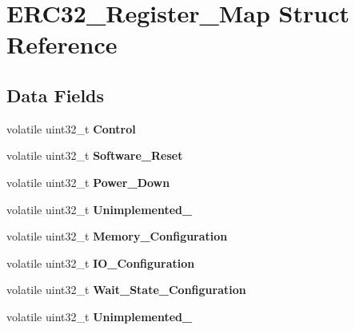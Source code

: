 \hypertarget{structERC32__Register__Map}{}\section{E\+R\+C32\+\_\+\+Register\+\_\+\+Map Struct Reference}
\label{structERC32__Register__Map}
\subsection*{Data Fields}
\begin{DoxyCompactItemize}
\item 
\mbox{\label{structERC32__Register__Map_afd7a2509b232cb018867b5483aade961}} 
volatile uint32\+\_\+t {\bfseries Control}
\item 
\mbox{\label{structERC32__Register__Map_a40bbadb83b7a1cd75684e7889e72b927}} 
volatile uint32\+\_\+t {\bfseries Software\+\_\+\+Reset}
\item 
\mbox{\label{structERC32__Register__Map_ae3c6e4f25730f1225c10dcf005e4896e}} 
volatile uint32\+\_\+t {\bfseries Power\+\_\+\+Down}
\item 
\mbox{\label{structERC32__Register__Map_ae862498f188029944efece2a42141399}} 
volatile uint32\+\_\+t {\bfseries Unimplemented\+\_}
\item 
\mbox{\label{structERC32__Register__Map_a89a45fe5d730165f99d939728cdabc32}} 
volatile uint32\+\_\+t {\bfseries Memory\+\_\+\+Configuration}
\item 
\mbox{\label{structERC32__Register__Map_a4482513d68b67be1a52e8c739bc67298}} 
volatile uint32\+\_\+t {\bfseries I\+O\+\_\+\+Configuration}
\item 
\mbox{\label{structERC32__Register__Map_a2bf1664a14948a607173d2fce1e0e47b}} 
volatile uint32\+\_\+t {\bfseries Wait\+\_\+\+State\+\_\+\+Configuration}
\item 
\mbox{\label{structERC32__Register__Map_a4984ef5f021f33fc3587df9e42a09f9d}} 
volatile uint32\+\_\+t {\bfseries Unimplemented\+\_}

\end{DoxyCompactItemize}
